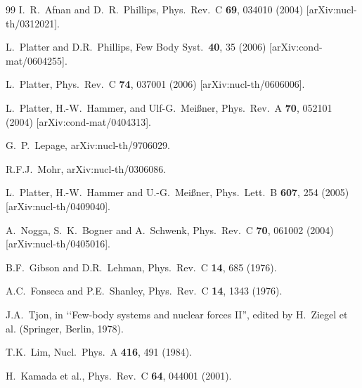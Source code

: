 \documentclass[prc,preprint,showpacs,tightenlines,%
nofootinbib]{revtex4}
\begin{document}
\begin{thebibliography}{99}
I.~R.~Afnan and D.~R.~Phillips,
Phys.\ Rev.\ C {\bf 69}, 034010 (2004)
[arXiv:nucl-th/0312021].

  L.~Platter and D.R.~Phillips,
  Few Body Syst.\  {\bf 40}, 35 (2006)
  [arXiv:cond-mat/0604255].

  L.~Platter,
  Phys.\ Rev.\ C {\bf 74}, 037001 (2006)
  [arXiv:nucl-th/0606006].

L.~Platter, H.-W.~Hammer, and Ulf-G.~Mei\ss ner,
Phys.\ Rev.\ A {\bf 70}, 052101 (2004) [arXiv:cond-mat/0404313].

G.~P.~Lepage,
arXiv:nucl-th/9706029.

R.F.J.~Mohr,
arXiv:nucl-th/0306086.

  L.~Platter, H.-W.~Hammer and U.-G.~Mei\ss ner,
  Phys.\ Lett.\ B {\bf 607}, 254 (2005)
  [arXiv:nucl-th/0409040].

  A.~Nogga, S.~K.~Bogner and A.~Schwenk,
  Phys.\ Rev.\  C {\bf 70}, 061002 (2004)
  [arXiv:nucl-th/0405016].

B.F.~Gibson and D.R.~Lehman, Phys.\ Rev.\ C {\bf 14}, 685 (1976).

A.C.~Fonseca and P.E.~Shanley, Phys.\ Rev.\ C {\bf 14}, 1343 (1976).

J.A.~Tjon, in \lq\lq Few-body systems and nuclear forces II'',
edited by H.~Ziegel et al. (Springer, Berlin, 1978).

T.K.~Lim, Nucl.\ Phys.\ A {\bf 416}, 491 (1984).

H.~Kamada et al.,  Phys.\ Rev.\ C {\bf 64}, 044001 (2001).


\end{thebibliography}
\end{document}
